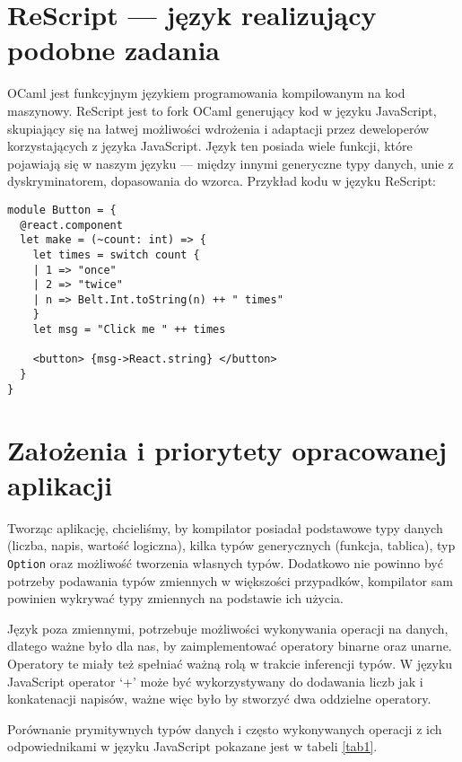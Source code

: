 \documentclass{article}
\begin{document}
\section{ReScript --- język realizujący podobne zadania}
OCaml jest funkcyjnym językiem programowania kompilowanym na kod maszynowy.
ReScript jest to fork OCaml generujący kod w języku JavaScript, skupiający się na łatwej możliwości wdrożenia i adaptacji przez deweloperów korzystających z języka JavaScript.
Język ten posiada wiele funkcji, które pojawiają się w naszym języku --- między innymi generyczne typy danych, unie z dyskryminatorem, dopasowania do wzorca.
\newpage
Przykład kodu w języku ReScript:
\begin{lstlisting}
module Button = {
  @react.component
  let make = (~count: int) => {
    let times = switch count {
    | 1 => "once"
    | 2 => "twice"
    | n => Belt.Int.toString(n) ++ " times"
    }
    let msg = "Click me " ++ times

    <button> {msg->React.string} </button>
  }
}
\end{lstlisting}
\section{Założenia i priorytety opracowanej aplikacji}
Tworząc aplikację, chcieliśmy, by kompilator posiadał podstawowe typy danych (liczba, napis, wartość logiczna), kilka typów generycznych (funkcja, tablica), typ \lstinline$Option$ oraz możliwość tworzenia własnych typów.
Dodatkowo nie powinno być potrzeby podawania typów zmiennych w większości przypadków, kompilator sam powinien wykrywać typy zmiennych na podstawie ich użycia.


Język poza zmiennymi, potrzebuje możliwości wykonywania operacji na danych, dlatego ważne było dla nas, by zaimplementować operatory binarne oraz unarne. Operatory te miały też spełniać ważną rolą w trakcie inferencji typów. W języku JavaScript operator `+' może być wykorzystywany do dodawania liczb jak i konkatenacji napisów, ważne więc było by stworzyć dwa oddzielne operatory.



Porównanie prymitywnych typów danych i często wykonywanych operacji z ich odpowiednikami w języku JavaScript pokazane jest w tabeli \ref{tab1}.
\end{document}
